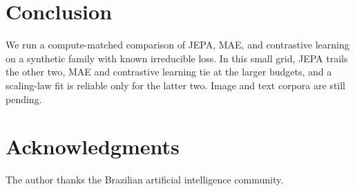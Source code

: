 \documentclass[conference]{IEEEtran}
\begin{document}
\section{Conclusion}
We run a compute-matched comparison of JEPA, MAE, and contrastive learning on a synthetic family with known irreducible loss. In this small grid, JEPA trails the other two, MAE and contrastive learning tie at the larger budgets, and a scaling-law fit is reliable only for the latter two. Image and text corpora are still pending.

\section*{Acknowledgments}
The author thanks the Brazilian artificial intelligence community.

\nocite{ctl_full_names}


\end{document}
